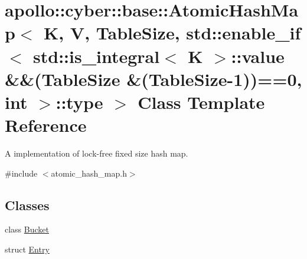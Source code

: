 \hypertarget{classapollo_1_1cyber_1_1base_1_1AtomicHashMap}{\section{apollo\-:\-:cyber\-:\-:base\-:\-:Atomic\-Hash\-Map$<$ K, V, Table\-Size, std\-:\-:enable\-\_\-if$<$ std\-:\-:is\-\_\-integral$<$ K $>$\-:\-:value \&\&(Table\-Size \&(Table\-Size-\/1))==0, int $>$\-:\-:type $>$ Class Template Reference}
\label{classapollo_1_1cyber_1_1base_1_1AtomicHashMap}
}


A implementation of lock-\/free fixed size hash map.  




{\ttfamily \#include $<$atomic\-\_\-hash\-\_\-map.\-h$>$}

\subsection*{Classes}
\begin{DoxyCompactItemize}
\item 
class \hyperlink{classapollo_1_1cyber_1_1base_1_1AtomicHashMap_1_1Bucket}{Bucket}
\item 
struct \hyperlink{structapollo_1_1cyber_1_1base_1_1AtomicHashMap_1_1Entry}{Entry}
\end{DoxyCompactItemize}
